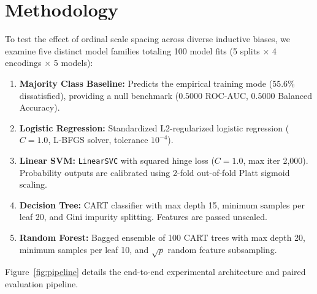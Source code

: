 \documentclass[10pt,a4paper]{article}
\begin{document}
\section{Methodology}
To test the effect of ordinal scale spacing across diverse inductive biases, we examine five distinct model families totaling 100 model fits (5 splits $\times$ 4 encodings $\times$ 5 models):
\begin{enumerate}[leftmargin=1.2em]
    \item \textbf{Majority Class Baseline:} Predicts the empirical training mode ($55.6\%$ dissatisfied), providing a null benchmark ($0.5000$ ROC-AUC, $0.5000$ Balanced Accuracy).
    \item \textbf{Logistic Regression:} Standardized L2-regularized logistic regression ($C=1.0$, L-BFGS solver, tolerance $10^{-4}$). 
    \item \textbf{Linear SVM:} \texttt{LinearSVC} with squared hinge loss ($C=1.0$, max iter 2,000). Probability outputs are calibrated using 2-fold out-of-fold Platt sigmoid scaling.
    \item \textbf{Decision Tree:} CART classifier with max depth 15, minimum samples per leaf 20, and Gini impurity splitting. Features are passed unscaled.
    \item \textbf{Random Forest:} Bagged ensemble of 100 CART trees with max depth 20, minimum samples per leaf 10, and $\sqrt{p}$ random feature subsampling.
\end{enumerate}

Figure~\ref{fig:pipeline} details the end-to-end experimental architecture and paired evaluation pipeline.
\end{document}
